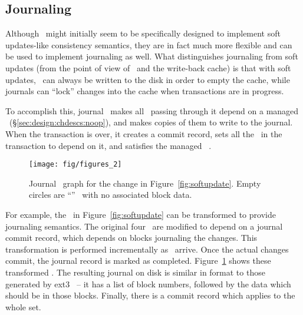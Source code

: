 \subsection{Journaling}
\label{sec:consistency:journal}

Although \chdescs\ might initially seem to be specifically designed to
implement soft updates-like consistency semantics, they are in fact much more
flexible and can be used to implement journaling as well. What distinguishes
journaling from soft updates (from the point of view of \chdescs\ and
the write-back cache) is that with soft updates, \chdescs\ can always
be written to the disk in order to empty the cache, while journals can
``lock'' changes into the cache when transactions are in progress.

To accomplish this, journal \module\ makes all \chdescs\ passing through it
depend on a managed \noop\ \chdesc (\S\ref{sec:design:chdescs:noop}), and makes
copies of them to write to the journal. When the transaction is over, it creates
a commit record, sets all the \chdescs\ in the transaction to depend on it, and
satisfies the managed \noop\ \chdesc.

\begin{figure}
  \centering
  \texttt{[image: fig/figures\_2]}
  \caption{\label{fig:journal} Journal \chdesc\ graph for the
    change in Figure~\ref{fig:softupdate}. Empty circles are
    ``\noop'' \chdescs\ with no associated block data.}
\end{figure}

For example, the \chdescs\ in Figure~\ref{fig:softupdate} can be
transformed to provide journaling semantics. The original four \chdescs\
are modified to depend on a journal commit record, which depends on blocks
journaling the changes. This transformation is performed incrementally as
\chdescs\ arrive. Once the actual changes commit, the journal record is
marked as completed. Figure~\ref{fig:journal} shows these transformed
\chdescs. The resulting journal on disk is similar in format to those
generated by ext3~\cite{tweedie98journaling} -- it has a list of block
numbers, followed by the data which should be in those blocks. Finally,
there is a commit record which applies to the whole set.

